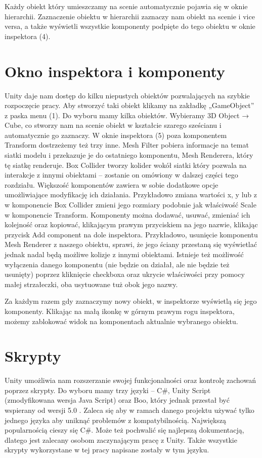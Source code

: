 \documentclass[brudnopis]{xmgr}
\begin{document}
Każdy obiekt który umieszczamy na scenie automatycznie pojawia się w oknie hierarchii. Zaznaczenie obiektu w hierarchii zaznaczy nam obiekt na scenie i vice versa, a także wyświetli wszystkie komponenty podpięte do tego obiektu w oknie inspektora (4).

\section{Okno inspektora i komponenty}

Unity daje nam dostęp do kilku niepustych obiektów pozwalających na szybkie rozpoczęcie pracy. Aby stworzyć taki obiekt klikamy na zakładkę „GameObject” z paska menu (1). Do wyboru mamy kilka obiektów. Wybieramy 3D Object → Cube, co stworzy nam na scenie obiekt w kształcie szarego sześcianu i automatycznie go zaznaczy. W oknie inspektora (5) poza komponentem Transform dostrzeżemy też trzy inne. Mesh Filter pobiera informacje na temat siatki modelu i przekazuje je do ostatniego komponentu, Mesh Renderera, który tę siatkę renderuje. Box Collider tworzy kolider wokół siatki który pozwala na interakcje z innymi obiektami – zostanie on omówiony w dalszej części tego rozdziału. Większość komponentów zawiera w sobie dodatkowe opcje umożliwiające modyfikację ich działania. Przykładowo zmiana wartości x, y  lub z w komponencie Box Collider zmieni jego rozmiary podobnie jak właściwość Scale w komponencie Transform. Komponenty można dodawać, usuwać, zmieniać ich kolejność oraz kopiować, klikającym prawym przyciskiem na jego nazwie, klikając przycisk Add component na dole inspektora. Przykładowo, usunięcie komponentu Mesh Renderer z naszego obiektu, sprawi, że jego ściany przestaną się wyświetlać jednak nadal będą możliwe kolizje z innymi obiektami.
Istnieje też możliwość wyłączenia danego komponentu (nie będzie on działał, ale nie będzie też usunięty) poprzez kliknięcie checkboxa  oraz ukrycie właściwości przy pomocy małej strzałeczki, oba usytuowane tuż obok jego nazwy.

Za każdym razem gdy zaznaczymy nowy obiekt, w inspektorze wyświetlą się jego komponenty. Klikając na małą ikonkę w górnym prawym rogu inspektora, możemy zablokować widok na komponentach aktualnie wybranego obiektu. 

\section{Skrypty}

Unity umożliwia nam rozszerzanie swojej funkcjonalności oraz kontrolę zachowań poprzez skrypty. Do wyboru mamy trzy języki – C\#, Unity Script (zmodyfikowana wersja Java Script) oraz Boo, który jednak przestał być wspierany od wersji 5.0 . Zaleca się aby w ramach danego projektu używać tylko jednego języka aby uniknąć problemów z kompatybilnością.
Największą popularnością cieszy się C\#. Może też pochwalić się najlepszą dokumentacją, dlatego jest zalecany osobom zaczynającym pracę z Unity. Także wszystkie skrypty wykorzystane w tej pracy napisane zostały w tym języku. 
\end{document}
